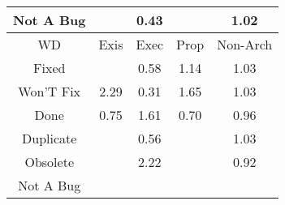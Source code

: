 \begin{tabular}{|c||c|c|c|c|}
\hline
Not A Bug &  & \cellcolor[rgb]{0.8149184306512858,0.3899472384160858,0.3312572019412} 0.43 &  & \cellcolor[rgb]{0.9041396660310465,0.8372240523304957,0.42} 1.02 \\ 
\hline
\hline
WD & Exis & Exec & Prop & Non-Arch \\ 
\hline
Fixed &  & \cellcolor[rgb]{0.8400569624680583,0.508936289015476,0.35471983163685444} 0.58 & \cellcolor[rgb]{0.8767709237815607,0.8242599112649498,0.42} 1.14 & \cellcolor[rgb]{0.9039853676465036,0.837150963622028,0.42} 1.03 \\ 
\hline
Won'T Fix & \cellcolor[rgb]{0.6020769962137901,0.6941417350486374,0.42} 2.29 & \cellcolor[rgb]{0.7948545920008688,0.29497840213744553,0.3125309525341442} 0.31 & \cellcolor[rgb]{0.7542866850179284,0.7662410613242819,0.42} 1.65 & \cellcolor[rgb]{0.9018290332401452,0.8361295420611214,0.42} 1.03 \\ 
\hline
Done & \cellcolor[rgb]{0.8685000084868162,0.6435667068375966,0.38126667458769514} 0.75 & \cellcolor[rgb]{0.7635923826058035,0.7706490233395911,0.42} 1.61 & \cellcolor[rgb]{0.8607057233826567,0.6066737573445747,0.37399200849047953} 0.70 & \cellcolor[rgb]{0.9040554835021751,0.8118626219102951,0.41445178460203} 0.96 \\ 
\hline
Duplicate &  & \cellcolor[rgb]{0.8366730628347787,0.49291916408461944,0.3515615253124602} 0.56 &  & \cellcolor[rgb]{0.903357967228672,0.8368537739504236,0.42} 1.03 \\ 
\hline
Obsolete &  & \cellcolor[rgb]{0.6193443917630888,0.7023210276772527,0.41999999999999993} 2.22 &  & \cellcolor[rgb]{0.8966290467203915,0.7767108211431857,0.4075204436056986} 0.92 \\ 
\hline
Not A Bug &  &  &  &  \\ 
\hline
\end{tabular}